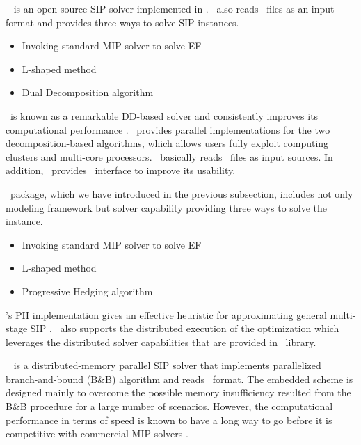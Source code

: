\dsp\ \cite{web:DSP} is an open-source SIP solver implemented in \cpp. \dsp\ also reads \smps\ files as an input format and provides three ways to solve SIP instances.
\begin{itemize}
	\item Invoking standard MIP solver to solve EF
	\item L-shaped method
	\item Dual Decomposition algorithm
\end{itemize}
\dsp\ is known as a remarkable DD-based solver and consistently improves its computational performance \cite{journal:KZ2015}. \dsp\ provides parallel implementations for the two decomposition-based algorithms, which allows users fully exploit computing clusters and multi-core processors. \dsp\ basically reads \smps\ files as input sources. In addition, \dsp\ provides \julia\ interface to improve its usability.

\pysp\ package, which we have introduced in the previous subsection, includes not only modeling framework but solver capability providing three ways to solve the instance. 
\begin{itemize}
	\item Invoking standard MIP solver to solve EF
	\item L-shaped method
	\item Progressive Hedging algorithm
\end{itemize}
\pysp's PH implementation gives an effective heuristic for approximating general multi-stage SIP \cite{journal:WWH2012}. \pysp\ also supports the distributed execution of the optimization which leverages the distributed solver capabilities that are provided in \pyomo\ library.

\pipssbb\ \cite{web:PIPS-SBB} is a distributed-memory parallel SIP solver that implements parallelized branch-and-bound (B\&B) algorithm and reads \smps\ format. The embedded scheme is designed mainly to overcome the possible memory insufficiency resulted from the B\&B procedure for a large number of scenarios. However, the computational performance in terms of speed is known to have a long way to go before it is competitive with commercial MIP solvers \cite{web:PIPS-SBB}.


